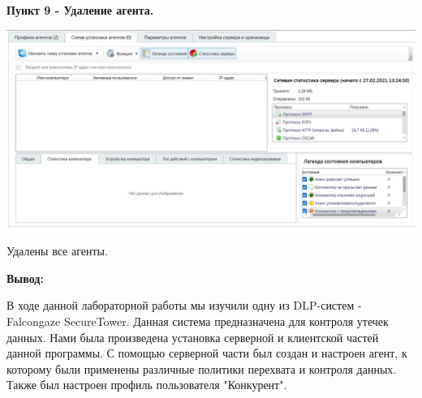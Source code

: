 \documentclass[a4paper,14pt]{extarticle}
\begin{document}
    \textbf{Пункт 9 - Удаление агента.} 
    \begin{center}
        \includegraphics[scale=0.25]{pics/9.jpg}

        Удалены все агенты. 
    \end{center}

    \newpage
    \textbf{Вывод:}

    В ходе данной лабораторной работы мы изучили одну из DLP-систем - Falcongaze SecureTower. 
    Данная система предназначена для контроля утечек данных. Нами была произведена установка 
    серверной и клиентской частей данной программы. С помощью серверной части был создан и 
    настроен агент, к которому были применены различные политики перехвата и контроля данных. 
    Также был настроен профиль пользователя "Конкурент".
\end{document}
